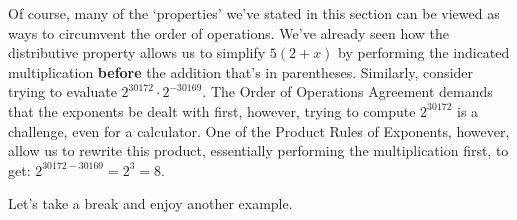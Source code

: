 \documentclass{ximera}
\begin{document}
\smallskip

Of course, many of the `properties' we've stated in this section can be viewed as ways to circumvent the order of operations. We've already seen how the distributive property allows us to simplify $5(2+x)$ by performing the indicated multiplication \textbf{before} the addition that's in parentheses.  Similarly, consider trying to evaluate $2^{30172}\cdot 2^{-30169}$.  The Order of Operations Agreement demands that the exponents be dealt with first, however, trying to compute $2^{30172}$ is a challenge, even for a calculator.  One of the Product Rules of Exponents, however, allow us to rewrite this product, essentially performing the multiplication first, to get:  $2^{30172-30169} = 2^{3} = 8$.  

\smallskip

Let's take a break and enjoy another example.

\smallskip
\end{document}

